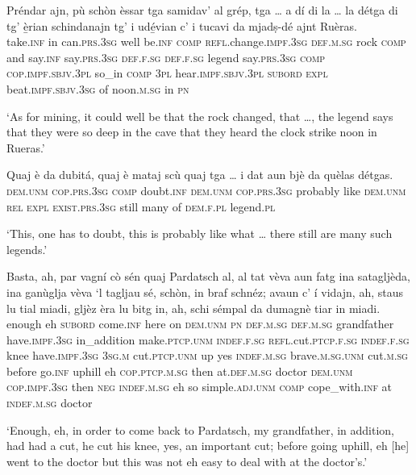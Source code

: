 \begin{linenumbers}
\gll Préndar ajn, pù schòn èssar tga samidav’ al grép, tga …  a dí di la … la détga di tg’ è̱rian schindanajn tg' i udé̱vian c’ i tucavi da mjadṣ-dé ajnt Ruèras.\\
take.\textsc{inf} in can.\textsc{prs.3sg} well be.\textsc{inf} \textsc{comp} \textsc{refl}.change.\textsc{impf.3sg} \textsc{def.m.sg} rock \textsc{comp} {} and say.\textsc{inf} say.\textsc{prs.3sg} \textsc{def.f.sg} {} \textsc{def.f.sg} legend say.\textsc{prs.3sg}  \textsc{comp} \textsc{cop.impf.sbjv.3pl} so\_in \textsc{comp} \textsc{3pl} hear.\textsc{impf.sbjv.3pl} \textsc{subord} \textsc{expl} beat.\textsc{impf.sbjv.3sg} of noon.\textsc{m.sg} in \textsc{pn}\\
\end{linenumbers}
\medskip
\glt `As for mining, it could well be that the rock changed, that …, the legend says that they were so deep in the cave that they heard the clock strike noon in Rueras.'
\medskip

\begin{linenumbers}
\gll  Quaj è da dubitá, quaj è mataj scù quaj tga … i dat aun bjè da quèlas détgas.  \\
 \textsc{dem.unm}  \textsc{cop.prs.3sg} \textsc{comp} doubt.\textsc{inf} \textsc{dem.unm} \textsc{cop.prs.3sg} probably like \textsc{dem.unm} \textsc{rel} {} \textsc{expl} \textsc{exist.prs.3sg} still many of \textsc{dem.f.pl} legend.\textsc{pl} \\
\end{linenumbers}
\medskip
\glt `This, one has to doubt, this is probably like what … there still are many such legends.'
\medskip

\begin{linenumbers}
\gll   Basta, ah, par vagní cò sén quaj Pardatsch al, al tat vèva aun fatg ina satagljèda, ina ganùglja vèva `l tagljau sé, schòn, in braf schnéz; avaun c’ í vidajn, ah, staus lu tial miadi, gljèz èra lu bitg in, ah, schi sémpal da dumagnè tiar in miadi. \\
enough eh \textsc{subord} come.\textsc{inf} here on \textsc{dem.unm} \textsc{pn} \textsc{def.m.sg} \textsc{def.m.sg} grandfather have.\textsc{impf.3sg} in\_addition make.\textsc{ptcp.unm} \textsc{indef.f.sg} \textsc{refl.}cut.\textsc{ptcp.f.sg} \textsc{indef.f.sg} knee have.\textsc{impf.3sg} \textsc{3sg.m} cut.\textsc{ptcp.unm} up yes \textsc{indef.m.sg} brave.\textsc{m.sg.unm} cut.\textsc{m.sg} before \textsc{} go.\textsc{inf} uphill eh \textsc{cop.ptcp.m.sg} then  at.\textsc{def.m.sg} doctor \textsc{dem.unm} \textsc{cop.impf.3sg} then \textsc{neg} \textsc{indef.m.sg} eh so simple.\textsc{adj.unm} \textsc{comp} cope\_with.\textsc{inf} at \textsc{indef.m.sg} doctor\\
\end{linenumbers}
\medskip
\glt `Enough, eh, in order to come back to Pardatsch, my grandfather, in addition, had had a cut, he cut his knee, yes, an important cut; before going uphill, eh [he] went to the doctor but this was not eh easy to deal with at the doctor’s.'
\medskip

